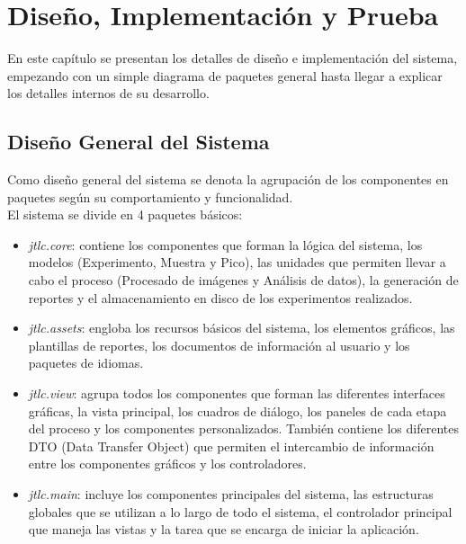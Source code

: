 \chapter{Dise\~no, Implementaci\'on y Prueba}
En este cap\'itulo se presentan los detalles de dise\~no e implementaci\'on del sistema, empezando con un simple diagrama de paquetes general hasta llegar a explicar los detalles internos de su desarrollo.

\section{Dise\~no General del Sistema}
Como dise\~no general del sistema se denota la agrupaci\'on de los componentes en paquetes seg\'un su comportamiento y funcionalidad.\\

El sistema se divide en 4 paquetes b\'asicos:
\begin{itemize}
	\item \textit{jtlc.core}: contiene los componentes que forman la l\'ogica del sistema, los modelos (Experimento, Muestra y Pico), las unidades que permiten llevar a cabo el proceso (Procesado de im\'agenes y An\'alisis de datos), la generaci\'on de reportes y el almacenamiento en disco de los experimentos realizados.
	\item \textit{jtlc.assets}: engloba los recursos b\'asicos del sistema, los elementos gr\'aficos, las plantillas de reportes, los documentos de informaci\'on al usuario y los paquetes de idiomas.
	\item \textit{jtlc.view}: agrupa todos los componentes que forman las diferentes interfaces gr\'aficas, la vista principal, los cuadros de di\'alogo, los paneles de cada etapa del proceso y los componentes personalizados. Tambi\'en contiene los diferentes DTO (Data Transfer Object) que permiten el intercambio de informaci\'on entre los componentes gr\'aficos y los controladores.
	\item \textit{jtlc.main}: incluye los componentes principales del sistema, las estructuras globales que se utilizan a lo largo de todo el sistema, el controlador principal que maneja las vistas y la tarea que se encarga de iniciar la aplicaci\'on.
\end{itemize}

